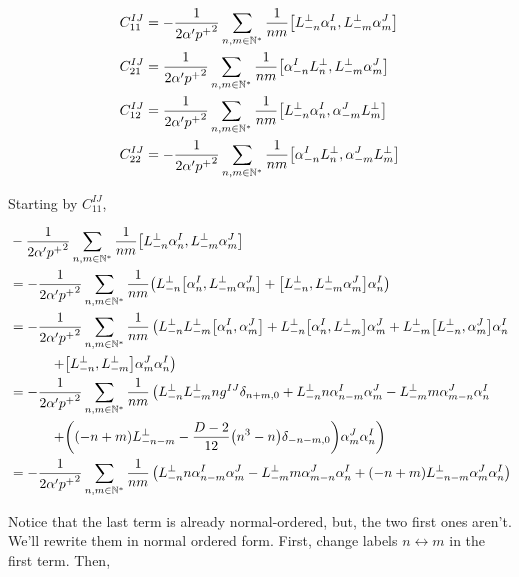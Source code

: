 \begin{align*}
    C_{11}^{IJ}&=-\frac{1}{2\alpha'{p^+}^2}\sum\limits_{n,m\in\mathbb N^\ast}\frac{1}{nm}\comm{L^\perp_{-n}\alpha^I_n}{L^\perp_{-m}\alpha^J_m}\\
    C_{21}^{IJ}&=\frac{1}{2\alpha'{p^+}^2}\sum\limits_{n,m\in\mathbb N^\ast}\frac{1}{nm}\comm{\alpha^I_{-n}L^\perp_n}{L^\perp_{-m}\alpha^J_m}\\
    C_{12}^{IJ}&=\frac{1}{2\alpha'{p^+}^2}\sum\limits_{n,m\in\mathbb N^\ast}\frac{1}{nm}\comm{L^\perp_{-n}\alpha^I_n}{\alpha^J_{-m}L^\perp_m}\\
    C_{22}^{IJ}&=-\frac{1}{2\alpha'{p^+}^2}\sum\limits_{n,m\in\mathbb N^\ast}\frac{1}{nm}\comm{\alpha^I_{-n}L^\perp_n}{\alpha^J_{-m}L^\perp_m}
\end{align*}

Starting by $C_{11}^{IJ}$,

\begin{align*}
    &-\frac{1}{2\alpha'{p^+}^2}\sum\limits_{n,m\in\mathbb N^\ast}\frac{1}{nm}\comm{L^\perp_{-n}\alpha^I_n}{L^\perp_{-m}\alpha^J_m}\\
    &=-\frac{1}{2\alpha'{p^+}^2}\sum\limits_{n,m\in\mathbb N^\ast}\frac{1}{nm}\qty(L^\perp_{-n}\comm{\alpha^I_n}{L^\perp_{-m}\alpha^J_m}+\comm{L^\perp_{-n}}{L^\perp_{-m}\alpha^J_m}\alpha^I_n)\\
    &=-\frac{1}{2\alpha'{p^+}^2}\sum\limits_{n,m\in\mathbb N^\ast}\frac{1}{nm}\left(L^\perp_{-n}L^\perp_{-m}\comm{\alpha^I_n}{\alpha^J_m}+L^\perp_{-n}\comm{\alpha^I_n}{L^\perp_{-m}}\alpha^J_m+L^\perp_{-m}\comm{L^\perp_{-n}}{\alpha^J_m}\alpha^I_n\right.\\
    &\quad\quad\quad\left.+\comm{L^\perp_{-n}}{L^\perp_{-m}}\alpha^J_m\alpha^I_n\right)\\
    &=-\frac{1}{2\alpha'{p^+}^2}\sum\limits_{n,m\in\mathbb N^\ast}\frac{1}{nm}\left(L^\perp_{-n}L^\perp_{-m}ng^{IJ}\delta_{n+m,0}+L^\perp_{-n}n\alpha^I_{n-m}\alpha^J_m-L^\perp_{-m}m\alpha^J_{m-n}\alpha^I_n\right.\\
    &\quad\quad\quad\left.+\qty(\qty(-n+m)L^\perp_{-n-m}-\frac{D-2}{12}\qty(n^3-n)\delta_{-n-m,0})\alpha^J_m\alpha^I_n\right)\\
    &=-\frac{1}{2\alpha'{p^+}^2}\sum\limits_{n,m\in\mathbb N^\ast}\frac{1}{nm}\left(L^\perp_{-n}n\alpha^I_{n-m}\alpha^J_m-L^\perp_{-m}m\alpha^J_{m-n}\alpha^I_n+\qty(-n+m)L^\perp_{-n-m}\alpha^J_m\alpha^I_n\right)
\end{align*}

Notice that the last term is already normal-ordered, but, the two first ones aren't. We'll rewrite them in normal ordered form. First, 
change labels $n\leftrightarrow m$ in the first term. Then,

